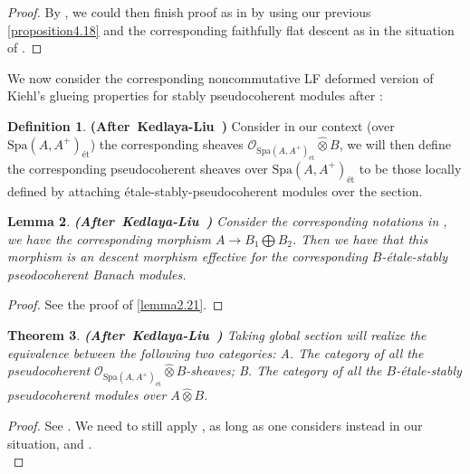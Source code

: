 \documentclass[12pt]{amsart}
\newtheorem{theorem}{Theorem}[section]
\newtheorem{lemma}[theorem]{Lemma}
\theoremstyle{definition}
\newtheorem{definition}[theorem]{Definition}
\numberwithin{equation}{section}
\begin{document}
\begin{proof}
By \cite[Proposition 8.2.21]{KL1}, we could then finish proof as in \cite[Theorem 2.5.11]{KL2} by using our previous \cref{proposition4.18} and the corresponding faithfully flat descent as in the situation of \cite[Theorem 2.5.11]{KL2}.	
\end{proof}


\indent We now consider the corresponding noncommutative LF deformed version of Kiehl's glueing properties for stably pseudocoherent modules after \cite{KL2}:



\begin{definition} \mbox{\bf{(After Kedlaya-Liu \cite[Definition 2.5.12]{KL2})}}
Consider in our context (over $\mathrm{Spa}(A,A^+)_{\text{\'et}}$) the corresponding sheaves $\mathcal{O}_{\mathrm{Spa}(A,A^+)_{\text{\'et}}}\widehat{\otimes}B$, we will then define the corresponding pseudocoherent sheaves over $\mathrm{Spa}(A,A^+)_{\text{\'et}}$ to be those locally defined by attaching \'etale-stably-pseudocoherent modules over the section. 
\end{definition}



\begin{lemma} \mbox{\bf{(After Kedlaya-Liu \cite[Lemma 2.5.13]{KL2})}}
	Consider the corresponding notations in \cite[Lemma 2.4.10]{KL2}, we have the corresponding morphism $A\rightarrow B_1\bigoplus B_2$. Then we have that this morphism is an descent morphism effective for the corresponding $B$-\'etale-stably pseodocoherent Banach modules. 
\end{lemma}


\begin{proof}
See the proof of \cref{lemma2.21}.


\end{proof}




\begin{theorem}\mbox{\bf{(After Kedlaya-Liu \cite[Theorem 2.5.14]{KL2})}} \label{theorem4.22}
Taking global section will realize the equivalence between the following two categories: A. The category of all the pseudocoherent $\mathcal{O}_{\mathrm{Spa}(A,A^+)_{\text{\'et}}}\widehat{\otimes}B$-sheaves; B. The category of all the $B$-\'etale-stably pseudocoherent modules over $A\widehat{\otimes}B$. 	
\end{theorem}


\begin{proof}
See \cite[Theorem 2.5.14]{KL2}. We need to still apply \cite[Theorem 8.2.22]{KL1}, as long as one considers instead in our situation, and \cite[Tag 03OD]{SP}.\\	
\end{proof}
\end{document}
